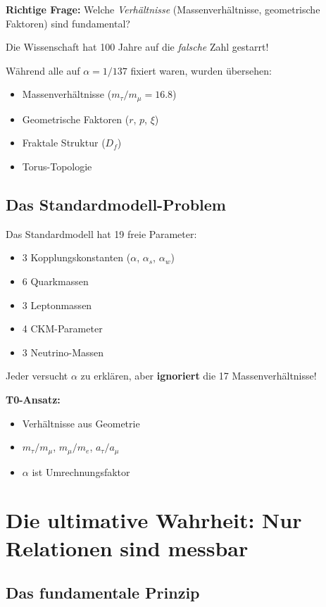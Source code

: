 \textbf{Richtige Frage:} Welche \textit{Verhältnisse} (Massenverhältnisse, geometrische Faktoren) sind fundamental?

\begin{important}
	Die Wissenschaft hat 100 Jahre auf die \textit{falsche} Zahl gestarrt!
	
	Während alle auf $\alpha = 1/137$ fixiert waren, wurden übersehen:
	\begin{itemize}[nosep]
		\item Massenverhältnisse ($m_\tau/m_\mu = 16.8$)
		\item Geometrische Faktoren ($r$, $p$, $\xi$)
		\item Fraktale Struktur ($D_f$)
		\item Torus-Topologie
	\end{itemize}
\end{important}

\subsection{Das Standardmodell-Problem}

Das Standardmodell hat 19 freie Parameter:
\begin{itemize}[nosep]
	\item 3 Kopplungskonstanten ($\alpha$, $\alpha_s$, $\alpha_w$)
	\item 6 Quarkmassen
	\item 3 Leptonmassen
	\item 4 CKM-Parameter
	\item 3 Neutrino-Massen
\end{itemize}

Jeder versucht $\alpha$ zu erklären, aber \textbf{ignoriert} die 17 Massenverhältnisse!

\textbf{T0-Ansatz:}
\begin{itemize}[nosep]
	\item Verhältnisse aus Geometrie
	\item $m_\tau/m_\mu$, $m_\mu/m_e$, $a_\tau/a_\mu$
	\item $\alpha$ ist Umrechnungsfaktor
\end{itemize}

\section{Die ultimative Wahrheit: Nur Relationen sind messbar}

\subsection{Das fundamentale Prinzip}

